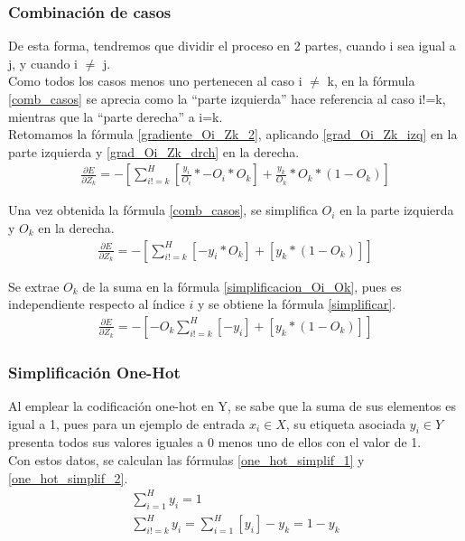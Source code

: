 \subsubsection{Combinación de casos}

De esta forma, tendremos que dividir  el proceso en 2 partes, cuando i sea igual a j, y cuando i $\neq$ j. \\
Como todos los casos menos uno pertenecen al caso i $\neq$ k, en la fórmula \ref{comb_casos} se aprecia como la ``parte izquierda'' hace referencia al caso i!=k, mientras que la ``parte derecha'' a i=k. \\
Retomamos la fórmula \ref{gradiente_Oi_Zk_2}, aplicando \ref{grad_Oi_Zk_izq} en la parte izquierda y \ref{grad_Oi_Zk_drch} en la derecha. \\
\begin{gather}
	\frac{\partial E}{\partial Z_k} = - [\sum_{i!=k}^{H} [\frac{y_i}{O_i} * -O_i * O_k ] + \frac{y_k}{O_k} * O_k * (1 - O_k)  ]
	\label{comb_casos}
\end{gather}

Una vez obtenida la fórmula \ref{comb_casos}, se simplifica $O_i$ en la parte izquierda y $O_k$ en la derecha. \\
\begin{gather}
	\frac{\partial E}{\partial Z_k} = - [\sum_{i!=k}^{H} [- y_i * O_k] + [y_k * (1 - O_k) ] ] 
	\label{simplificacion_Oi_Ok}
\end{gather}

Se extrae $O_k$ de la suma en la fórmula \ref{simplificacion_Oi_Ok}, pues es independiente respecto al índice $i$ y se obtiene la fórmula \ref{simplificar}.\\
\begin{gather}	
	\frac{\partial E}{\partial Z_k} = - [-O_k \sum_{i!=k}^{H}[-y_i] + [y_k * (1 - O_k) ] ]
	\label{simplificar}
\end{gather}

\subsubsection{Simplificación One-Hot}

Al emplear la codificación one-hot en Y, se sabe que la suma de sus elementos es igual a 1, pues para un ejemplo de entrada $x_i \in X$, su etiqueta asociada $y_i \in Y$ presenta todos sus valores iguales a 0 menos uno de ellos con el valor de 1. \\
Con estos datos, se calculan las fórmulas \ref{one_hot_simplif_1} y \ref{one_hot_simplif_2}.
\begin{gather}
	\sum_{i=1}^{H} y_i = 1 \label{one_hot_simplif_1}\\
	\sum_{i!=k}^{H} y_i = \sum_{i=1}^{H} [y_i] - y_k = 1 - y_k
	\label{one_hot_simplif_2}
\end{gather}

